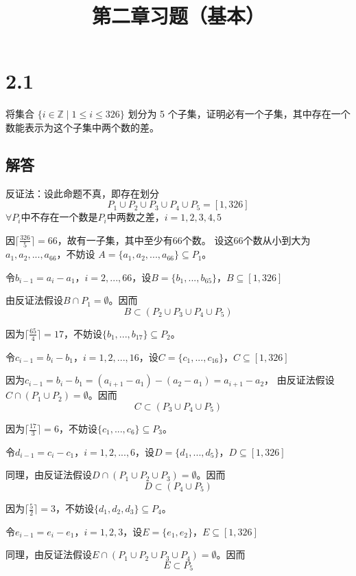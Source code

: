 \documentclass[12pt]{article}
\title{第二章习题（基本）}
\begin{document}
\maketitle

\section*{2.1}
将集合 $\{ i \in \mathbb{Z} \mid 1 \leq i \leq 326 \}$ 划分为 5 个子集，证明必有一个子集，其中存在一个数能表示为这个子集中两个数的差。
\subsection*{解答}
反证法：设此命题不真，即存在划分
\[P_{1} \cup P_{2} \cup P_{3} \cup P_{4} \cup P_{5}=[1,326]\]
$\forall P_{i}$中不存在一个数是$P_{i}$中两数之差，$i=1,2,3,4,5$

因$\lceil\frac{326}{5}\rceil=66$，故有一子集，其中至少有66个数。
设这66个数从小到大为$a_{1},a_{2},...,a_{66}$，不妨设
$A=\{a_{1},a_{2},...,a_{66}\} \subseteq P_{1}$。

令$b_{i-1}=a_{i}-a_{1}$，$i=2,...,66$，设$B=\{b_{1},...,b_{65}\}$，$B \subseteq [1,326]$

由反证法假设$B \cap P_{1}=\emptyset$。因而
\[B \subset (P_{2} \cup P_{3} \cup P_{4} \cup P_{5})\]

因为$\lceil\frac{65}{4}\rceil=17$，不妨设$\{b_{1},...,b_{17}\} \subseteq P_{2}$。

令$c_{i-1}=b_{i}-b_{1}$，$i=1,2,...,16$，设$C=\{c_{1},...,c_{16}\}$，$C \subseteq [1,326]$

因为$c_{i-1}=b_{i}-b_{1}=(a_{i+1}-a_{1})-(a_{2}-a_{1})=a_{i+1}-a_{2}$，
由反证法假设$C \cap (P_{1} \cup P_{2}) =\emptyset$。因而
\[C \subset (P_{3} \cup P_{4} \cup P_{5})\]

因为$\lceil\frac{17}{3}\rceil=6$，不妨设$\{c_{1},...,c_{6}\} \subseteq P_{3}$。

令$d_{i-1}=c_{i}-c_{1}$，$i=1,2,...,6$，设$D=\{d_{1},...,d_{5}\}$，$D \subseteq [1,326]$

同理，由反证法假设$D \cap (P_{1} \cup P_{2} \cup P_{3}) =\emptyset$。因而
\[D \subset (P_{4} \cup P_{5})\]

因为$\lceil\frac{5}{2}\rceil=3$，不妨设$\{d_{1},d_{2},d_{3}\} \subseteq P_{4}$。

令$e_{i-1}=e_{i}-e_{1}$，$i=1,2,3$，设$E=\{e_{1},e_{2}\}$，$E \subseteq [1,326]$

同理，由反证法假设$E \cap (P_{1} \cup P_{2} \cup P_{3} \cup P_{4}) =\emptyset$。因而
\[E \subset P_{5}\]
\end{document}
